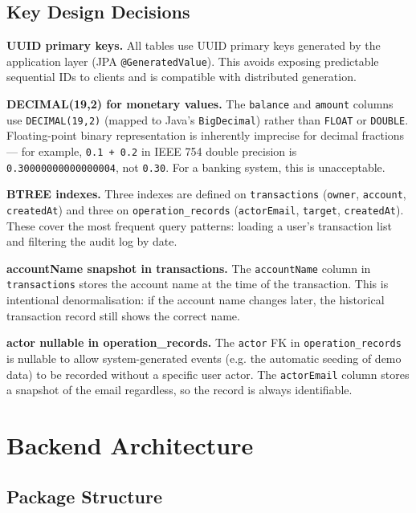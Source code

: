 \documentclass[12pt,a4paper]{report}
\begin{document}
\section{Key Design Decisions}

\textbf{UUID primary keys.} All tables use UUID primary keys generated by the
application layer (JPA \texttt{@GeneratedValue}). This avoids exposing predictable
sequential IDs to clients and is compatible with distributed generation.

\textbf{DECIMAL(19,2) for monetary values.} The \texttt{balance} and \texttt{amount}
columns use \texttt{DECIMAL(19,2)} (mapped to Java's \texttt{BigDecimal}) rather than
\texttt{FLOAT} or \texttt{DOUBLE}. Floating-point binary representation is inherently
imprecise for decimal fractions — for example, \texttt{0.1 + 0.2} in IEEE 754 double
precision is \texttt{0.30000000000000004}, not \texttt{0.30}. For a banking system,
this is unacceptable.

\textbf{BTREE indexes.} Three indexes are defined on \texttt{transactions}
(\texttt{owner}, \texttt{account}, \texttt{createdAt}) and three on
\texttt{operation\_records} (\texttt{actorEmail}, \texttt{target}, \texttt{createdAt}).
These cover the most frequent query patterns: loading a user's transaction list and
filtering the audit log by date.

\textbf{accountName snapshot in transactions.} The \texttt{accountName} column in
\texttt{transactions} stores the account name at the time of the transaction.
This is intentional denormalisation: if the account name changes later, the historical
transaction record still shows the correct name.

\textbf{actor nullable in operation\_records.} The \texttt{actor} FK in
\texttt{operation\_records} is nullable to allow system-generated events (e.g. the
automatic seeding of demo data) to be recorded without a specific user actor.
The \texttt{actorEmail} column stores a snapshot of the email regardless,
so the record is always identifiable.

\chapter{Backend Architecture}
\label{ch:backend}

\section{Package Structure}
\end{document}
